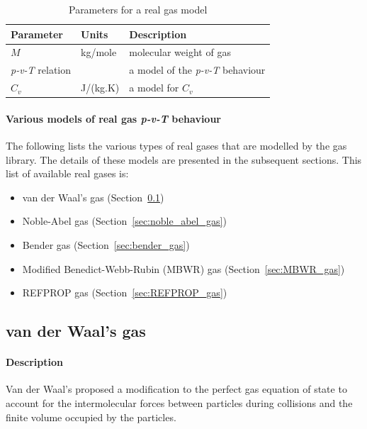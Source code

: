 \begin{table}[h!]
\caption{Parameters for a real gas model}
\label{tab:real-gas}
\begin{tabular}{llp{10cm}}
\toprule
Parameter & Units & Description \\ \midrule
$M$       & kg/mole & molecular weight of gas \\
\textit{p-v-T} relation & & a model of the \textit{p-v-T} behaviour \\
$C_v$  & J/(kg.K) & a model for $C_v$ \\
\bottomrule
\end{tabular}
\end{table}

\paragraph{Various models of real gas \textit{p-v-T} behaviour}
The following lists the various types of real gases that are modelled
by the gas library.
The details of these models are presented in the subsequent sections.
This list of available real gases is:
\begin{itemize}
\item van der Waal's gas (Section~\ref{sec:van_der_waals_gas})
\item Noble-Abel gas (Section~\ref{sec:noble_abel_gas})
\item Bender gas (Section~\ref{sec:bender_gas})
\item Modified Benedict-Webb-Rubin (MBWR) gas (Section~\ref{sec:MBWR_gas})
\item REFPROP gas (Section~\ref{sec:REFPROP_gas})
\end{itemize}

\subsection{van der Waal's gas}
\label{sec:van_der_waals_gas}
\paragraph{Description}
Van der Waal's proposed a modification to the perfect
gas equation of state to account for the intermolecular
forces between particles during collisions and
the finite volume occupied by the particles.

